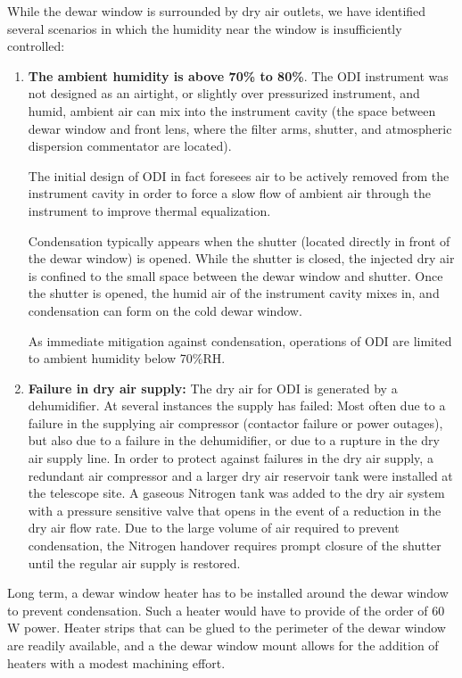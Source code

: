 \documentclass[]{spieman}
\begin{document}
While the dewar window is surrounded by dry air outlets, we have identified
several scenarios in which the humidity near the window is insufficiently
controlled:

\begin{enumerate}
	\item {\bf The ambient humidity is above 70\% to 80\%}. The ODI instrument 
	was not designed as an airtight, or slightly over pressurized instrument, 
	and humid, ambient air can mix into the instrument cavity (the space 
	between dewar window and front lens, where the filter arms, shutter, and 
	atmospheric dispersion commentator are located).
	
	The initial design of ODI in fact foresees air to be actively removed from 
	the instrument cavity in order to force a slow flow of ambient air through 
	the instrument to improve thermal equalization. 
	
	Condensation typically appears when the shutter (located directly in front 
	of the dewar window) is opened. While the shutter is closed, the injected 
	dry air is confined to the small space between the dewar window and 
	shutter. Once the shutter is opened, the  humid air of the instrument 
	cavity mixes in, and condensation can form on the cold dewar window. 
	
	As immediate mitigation against condensation, operations of ODI are limited 
	to ambient humidity below 70\%RH.
	
	\item {\bf Failure in dry air supply:} The dry air for ODI is generated by 
	a dehumidifier. At several instances the supply has failed: Most often due 
	to a failure in the supplying air compressor (contactor failure or power 
	outages), but also due to a failure in the dehumidifier, or due to a 
	rupture in the dry air supply line. In order to protect against failures in 
	the dry air supply, a redundant air compressor and a larger dry air 
	reservoir tank were installed at the telescope site. A gaseous Nitrogen tank was added to the dry air system with a pressure sensitive valve that opens in the event of a reduction in the dry air flow rate. Due to the large volume of air required to prevent condensation, the Nitrogen handover requires prompt closure of the shutter until the regular air supply is restored.

\end{enumerate}

Long term, a dewar window heater has to be installed  around the dewar window 
to prevent condensation. Such a heater would have to provide of the order of 60 
W power. Heater strips that can be glued to the perimeter of the dewar window 
are readily available, and a the dewar window mount allows for the addition of 
heaters with a modest machining effort.  
\end{document}
